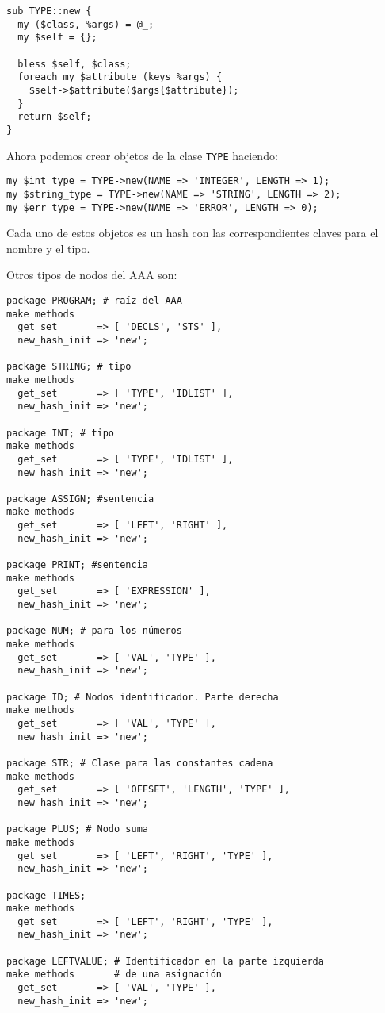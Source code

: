 \begin{verbatim}
sub TYPE::new {
  my ($class, %args) = @_;
  my $self = {};

  bless $self, $class;
  foreach my $attribute (keys %args) {
    $self->$attribute($args{$attribute});
  }
  return $self;
}
\end{verbatim}

Ahora podemos crear objetos de la clase \verb|TYPE| haciendo:
\begin{verbatim}
my $int_type = TYPE->new(NAME => 'INTEGER', LENGTH => 1); 
my $string_type = TYPE->new(NAME => 'STRING', LENGTH => 2);
my $err_type = TYPE->new(NAME => 'ERROR', LENGTH => 0);
\end{verbatim}
Cada uno de estos objetos es un hash con las correspondientes
claves para el nombre y el tipo.

Otros tipos de nodos del AAA son:

\begin{verbatim}
package PROGRAM; # raíz del AAA
make methods
  get_set       => [ 'DECLS', 'STS' ],
  new_hash_init => 'new';

package STRING; # tipo
make methods
  get_set       => [ 'TYPE', 'IDLIST' ],
  new_hash_init => 'new';

package INT; # tipo
make methods
  get_set       => [ 'TYPE', 'IDLIST' ],
  new_hash_init => 'new';

package ASSIGN; #sentencia
make methods
  get_set       => [ 'LEFT', 'RIGHT' ],
  new_hash_init => 'new';

package PRINT; #sentencia
make methods
  get_set       => [ 'EXPRESSION' ],
  new_hash_init => 'new';

package NUM; # para los números
make methods
  get_set       => [ 'VAL', 'TYPE' ],
  new_hash_init => 'new';

package ID; # Nodos identificador. Parte derecha
make methods
  get_set       => [ 'VAL', 'TYPE' ],
  new_hash_init => 'new';

package STR; # Clase para las constantes cadena
make methods
  get_set       => [ 'OFFSET', 'LENGTH', 'TYPE' ],
  new_hash_init => 'new';

package PLUS; # Nodo suma
make methods
  get_set       => [ 'LEFT', 'RIGHT', 'TYPE' ],
  new_hash_init => 'new';

package TIMES;
make methods
  get_set       => [ 'LEFT', 'RIGHT', 'TYPE' ],
  new_hash_init => 'new';

package LEFTVALUE; # Identificador en la parte izquierda
make methods       # de una asignación
  get_set       => [ 'VAL', 'TYPE' ],
  new_hash_init => 'new';
\end{verbatim}


